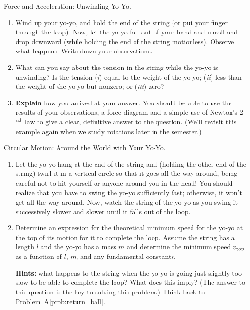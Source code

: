 \begin{aproblem}{Force and Acceleration: Unwinding Yo-Yo.}
  \begin{enumerate}
  \item Wind up your yo-yo, and hold the end of the string (or put
    your finger through the loop).  Now, let the yo-yo fall out of
    your hand and unroll and drop downward (while holding the end of
    the string motionless).  Observe what happens.  Write down your
    observations.

  \item What can you say about the tension in the string while the
    yo-yo is unwinding?  Is the tension ({\it i}) equal to the weight of the
    yo-yo; ({\it ii}) less than the weight of the yo-yo but nonzero; 
    or ({\it iii}) zero?

  \item {\bf Explain} how you arrived at your answer.  You should be
    able to use the results of your observations, a force diagram and
    a simple use of Newton's 2$^{\rm nd}$ law to give a clear,
    definitive answer to the question. (We'll revisit this example
    again when we study rotations later in the semester.)

  \end{enumerate}
\label{prob:yoyoI}
\end{aproblem}


\begin{aproblem}{Circular Motion:  Around the World with Your Yo-Yo.}
  \begin{enumerate}
  \item Let the yo-yo hang at the end of the string and (holding the
    other end of the string) twirl it in a vertical circle so that it
    goes all the way around, being careful not to hit yourself or
    anyone around you in the head!  You should realize that you have
    to swing the yo-yo sufficiently fast; otherwise, it won't get all
    the way around.  Now, watch the string of the yo-yo as you swing
    it successively slower and slower until it falls out of the loop.

  \item Determine an expression for the theoretical minimum speed for
    the yo-yo at the top of its motion for it to complete the loop.
    Assume the string has a length $l$ and the yo-yo has a mass $m$
    and determine the minimum speed $v_{\rm top}$ as a function of
    $l$, $m$, and any fundamental constants.  \vspace{0.1in}

    {\bf Hints:} what happens to the string when the yo-yo is going
    just slightly too slow to be able to complete the loop?  What does
    this imply?  (The answer to this question is the key to solving
    this problem.)  Think back to Problem~A\ref{prob:return_ball}.
  \end{enumerate}
\end{aproblem}



